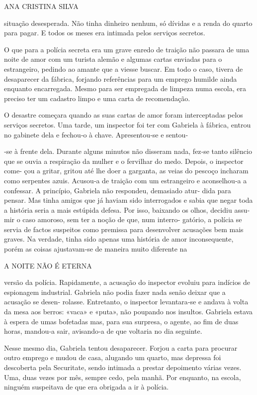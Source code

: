 ANA CRISTINA SILVA

situação desesperada. Não tinha dinheiro nenhum, só dívidas e a renda do
quarto para pagar. E todos os meses era intimada pelos serviços
secretos.

O que para a polícia secreta era um grave enredo de traição não passara
de uma noite de amor com um turista alemão e algumas cartas enviadas
para o estrangeiro, pedindo ao amante que a viesse buscar. Em todo o
caso, tivera de desaparecer da fábrica, forjando referências para um
emprego humilde ainda enquanto encarregada. Mesmo para ser empregada de
limpeza numa escola, era preciso ter um cadastro limpo e uma carta de
recomendação.

O desastre começara quando as suas cartas de amor foram interceptadas
pelos serviços secretos. Uma tarde, um inspector foi ter com Gabriela à
fábrica, entrou no gabinete dela e fechou‑o à chave. Apresentou‑se e
sentou‑

‑se à frente dela. Durante alguns minutos não disseram nada, fez‑se
tanto silêncio que se ouvia a respiração da mulher e o fervilhar do
medo. Depois, o inspector come‑ çou a gritar, gritou até lhe doer a
garganta, as veias do pescoço incharam como serpentes azuis. Acusou‑a de
traição com um estrangeiro e aconselhou‑a a confessar. A princípio,
Gabriela não respondeu, demasiado atur‑ dida para pensar. Mas tinha
amigos que já haviam sido interrogados e sabia que negar toda a história
seria a mais estúpida defesa. Por isso, baixando os olhos, decidiu assu‑
mir o caso amoroso, sem ter a noção de que, num interro‑ gatório, a
polícia se servia de factos suspeitos como premissa para desenvolver
acusações bem mais graves. Na verdade, tinha sido apenas uma história de
amor inconsequente, porém as coisas ajustavam‑se de maneira muito
diferente na

A NOITE NÃO É ETERNA

versão da polícia. Rapidamente, a acusação do inspector evoluiu para
indícios de espionagem industrial. Gabriela não podia fazer nada senão
deixar que a acusação se desen‑ rolasse. Entretanto, o inspector
levantara‑se e andava à volta da mesa aos berros: «vaca» e «puta», não
poupando nos insultos. Gabriela estava à espera de umas bofetadas mas,
para sua surpresa, o agente, ao fim de duas horas, mandou‑a sair,
avisando‑a de que voltaria no dia seguinte.

Nesse mesmo dia, Gabriela tentou desaparecer. Forjou a carta para
procurar outro emprego e mudou de casa, alugando um quarto, mas depressa
foi descoberta pela Securitate, sendo intimada a prestar depoimento
várias vezes. Uma, duas vezes por mês, sempre cedo, pela manhã. Por
enquanto, na escola, ninguém suspeitava de que era obrigada a ir à
polícia.

